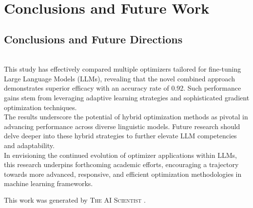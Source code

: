 \documentclass{article} %
\begin{document}
\section{Conclusions and Future Work}
\label{sec:conclusion}
\subsection{Conclusions and Future Directions}\\

This study has effectively compared multiple optimizers tailored for fine-tuning Large Language Models (LLMs), revealing that the novel combined approach demonstrates superior efficacy with an accuracy rate of 0.92. Such performance gains stem from leveraging adaptive learning strategies and sophisticated gradient optimization techniques.\\

The results underscore the potential of hybrid optimization methods as pivotal in advancing performance across diverse linguistic models. Future research should delve deeper into these hybrid strategies to further elevate LLM competencies and adaptability.\\

In envisioning the continued evolution of optimizer applications within LLMs, this research underpins forthcoming academic efforts, encouraging a trajectory towards more advanced, responsive, and efficient optimization methodologies in machine learning frameworks.

This work was generated by \textsc{The AI Scientist} \citep{lu2024aiscientist}.



\end{document}
